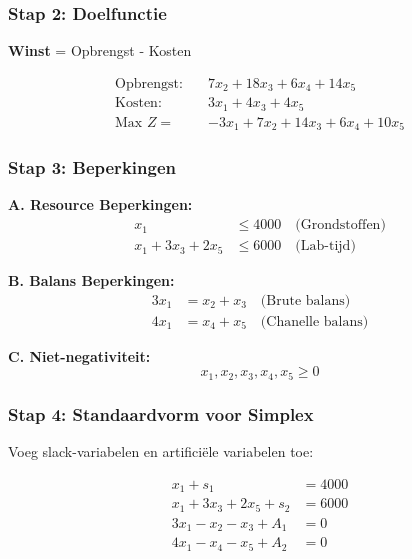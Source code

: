 \documentclass[a4paper,11pt]{article}
\begin{document}
\begin{oefenblok}
    \subsubsection*{Stap 2: Doelfunctie}

    \textbf{Winst} = Opbrengst - Kosten

    \begin{align*}
        \text{Opbrengst:} \quad & 7x_2 + 18x_3 + 6x_4 + 14x_5         \\
        \text{Kosten:} \quad    & 3x_1 + 4x_3 + 4x_5                  \\
        \hline
        \text{Max } Z =         & -3x_1 + 7x_2 + 14x_3 + 6x_4 + 10x_5
    \end{align*}

    \subsubsection*{Stap 3: Beperkingen}

    \textbf{A. Resource Beperkingen:}
    \begin{align}
        x_1               & \leq 4000 \quad \text{(Grondstoffen)} \\
        x_1 + 3x_3 + 2x_5 & \leq 6000 \quad \text{(Lab-tijd)}
    \end{align}

    \textbf{B. Balans Beperkingen:}
    \begin{align}
        3x_1 & = x_2 + x_3 \quad \text{(Brute balans)}    \\
        4x_1 & = x_4 + x_5 \quad \text{(Chanelle balans)}
    \end{align}

    \textbf{C. Niet-negativiteit:}
    \[
        x_1, x_2, x_3, x_4, x_5 \geq 0
    \]

    \subsubsection*{Stap 4: Standaardvorm voor Simplex}

    Voeg slack-variabelen en artificiële variabelen toe:

    \begin{align*}
        x_1 + s_1               & = 4000 \\
        x_1 + 3x_3 + 2x_5 + s_2 & = 6000 \\
        3x_1 - x_2 - x_3 + A_1  & = 0    \\
        4x_1 - x_4 - x_5 + A_2  & = 0
    \end{align*}


\end{oefenblok}
\end{document}
